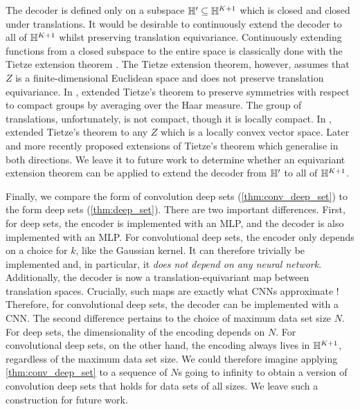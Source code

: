 \documentclass[12pt, twoside]{report}
\begin{document}
The decoder is defined only on a subspace $\mathbb{H}' \subseteq \mathbb{H}^{K+1}$ which is closed and closed under translations.
It would be desirable to continuously extend the decoder to all of $\mathbb{H}^{K+1}$ whilst preserving translation equivariance.
Continuously extending functions from a closed subspace to the entire space is classically done with the Tietze extension theorem \parencite[Theorem 35.1;][]{Munkres:2000:Topology}.
The Tietze extension theorem, however, assumes that $Z$ is a finite-dimensional Euclidean space and does not preserve translation equivariance.
In \citeyear{Gleason:1950:Spaces_With_a_Compact_Lie}, \citeauthor{Gleason:1950:Spaces_With_a_Compact_Lie} extended Tietze's theorem to preserve symmetries with respect to compact groups by averaging over the Haar measure.
The group of translations, unfortunately, is not compact, though it is locally compact.
In \citeyear{Dugundji:1951:An_Extension_of_Tietzes_Theorem},
\citeauthor{Dugundji:1951:An_Extension_of_Tietzes_Theorem} extended Tietze's theorem to any $Z$ which is a locally convex vector space.
Later \textcite{Jaworowski:1981:An_Equivariant_Extension_Theorem_and} and more recently \textcite{Feragen:2006:Characterization_of_Equivariant_ANEs} proposed extensions of Tietze's theorem which generalise in both directions.
We leave it to future work to determine whether an equivariant extension theorem can be applied to extend the decoder from $\mathbb{H}'$ to all of $\mathbb{H}^{K+1}$.

Finally, we compare the form of convolution deep sets (\cref{thm:conv_deep_set}) to the form deep sets (\cref{thm:deep_set}).
There are two important differences.
First, for deep sets, the encoder is implemented with an MLP, and the decoder is also implemented with an MLP.
For convolutional deep sets, the encoder only depends on a choice for $k$, like the Gaussian kernel.
It can therefore trivially be implemented and, in particular, it \emph{does not depend on any neural network}.
Additionally, the decoder is now a translation-equivariant map between translation spaces.
Crucially, such maps are exactly what CNNs approximate \parencite[Theorem 3.1;][]{Yarotsky:2022:Universal_Approximations_of_Invariant_Maps}!
Therefore, for convolutional deep sets, the decoder can be implemented with a CNN.
The second difference pertains to the choice of maximum data set size $N$.
For deep sets, the dimensionality of the encoding depends on $N$.
For convolutional deep sets, on the other hand, the encoding always lives in $\mathbb{H}^{K+1}$, regardless of the maximum data set size.
We could therefore imagine applying \cref{thm:conv_deep_set} to a sequence of $N$s going to infinity to obtain a version of convolution deep sets that holds for data sets of all sizes.
We leave such a construction for future work.
\end{document}
